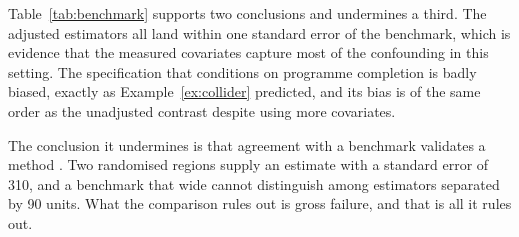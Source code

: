 Table~\ref{tab:benchmark} supports two conclusions and undermines a third. The
adjusted estimators all land within one standard error of the benchmark, which
is evidence that the measured covariates capture most of the confounding in this
setting. The specification that conditions on programme completion is badly
biased, exactly as Example~\ref{ex:collider} predicted, and its bias is of the
same order as the unadjusted contrast despite using more covariates.

The conclusion it undermines is that agreement with a benchmark validates a
method \citep{weiss2014benchmark}. Two randomised regions supply an estimate with a standard error of 310,
and a benchmark that wide cannot distinguish among estimators separated by 90
units. What the comparison rules out is gross failure, and that is all it rules
out.
